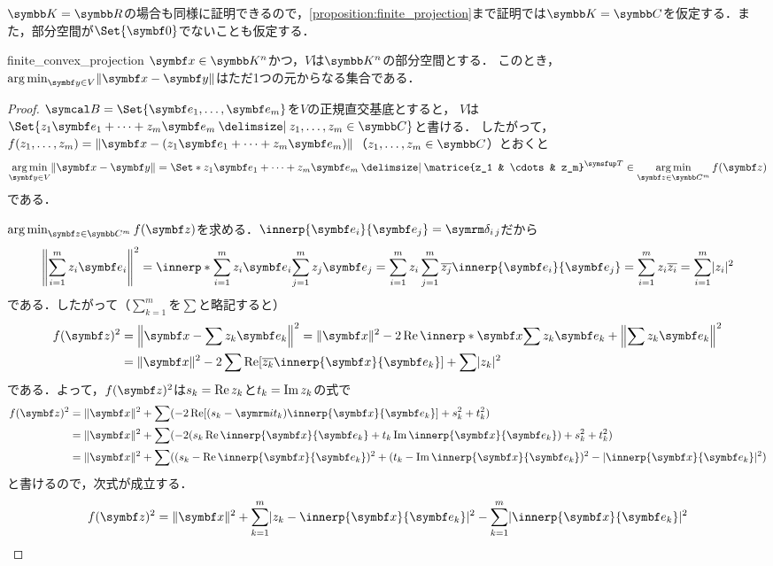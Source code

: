 \documentclass[../../main]{subfiles}
\begin{document}
\(\numset{K}=\numset{R}\)の場合も同様に証明できるので，\cref{proposition:finite_projection}まで証明では\(\numset{K}=\numset{C}\)を仮定する．また，部分空間が\(\Set{\zvec}\)でないことも仮定する．

\begin{proposition}{}{finite_convex_projection}
  \(\vect{x}\in\numset{K}^n\)かつ，\(V\)は\(\numset{K}^n\)の部分空間とする．
  このとき，\(\argmin_{\vect{y}\in V}\vnorm{\vect{x}-\vect{y}}\)はただ1つの元からなる集合である．
\end{proposition}

\begin{proof}
  \(\basis{B}=\Set{\vect{e}_1,\dots,\vect{e}_m}\)を\(V\)の正規直交基底とすると，
  \(V\)は\(\Set{z_1\vect{e}_1+\dots+z_m\vect{e}_m\given z_1,\dots,z_m\in\numset{C}}\)と書ける．
  したがって，\(f(z_1,\dots,z_m)=\vnorm{\vect{x}-(z_1\vect{e}_1+\dots+z_m\vect{e}_m)}\)（\(z_1,\dots,z_m\in\numset{C}\)）とおくと
  \[
    \argmin_{\vect{y}\in V}\vnorm{\vect{x}-\vect{y}} = \Set*{z_1\vect{e}_1+\dots+z_m\vect{e}_m\given\trps{\matrice{z_1 & \cdots & z_m}}\in\argmin_{\vect{z}\in\numset{C}^m}f(\vect{z})}
  \]
  である．

  \(\argmin_{\vect{z}\in\numset{C}^m}f(\vect{z})\)を求める．\(\innerp{\vect{e}_i}{\vect{e}_j}=\kdelta{i}{j}\)だから
  \[
    \vnorm*{\sum_{i=1}^mz_i\vect{e}_i}^2 = \innerp*{\sum_{i=1}^mz_i\vect{e}_i}{\sum_{j=1}^mz_j\vect{e}_j}
    = \sum_{i=1}^mz_i\sum_{j=1}^m\conj{z_j}\innerp{\vect{e}_i}{\vect{e}_j}
    = \sum_{i=1}^mz_i\conj{z_i}
    = \sum_{i=1}^m\abs{z_i}^2
  \]
  である．したがって（\(\sum_{k=1}^m\)を\(\sum\)と略記すると）
  \begin{align*}
    f(\vect{z})^2 &= \vnorm*{\vect{x}-\sum z_k\vect{e}_k}^2 = \vnorm{\vect{x}}^2-2\rpart\innerp*{\vect{x}}{\sum z_k\vect{e}_k}+\vnorm*{\sum z_k\vect{e}_k}^2 \\
    &= \vnorm{\vect{x}}^2-2\sum\rpart[\conj{z_k}\innerp{\vect{x}}{\vect{e}_k}]+\sum\abs{z_k}^2
  \end{align*}
  である．よって，\(f(\vect{z})^2\)は\(s_k=\operatorname{Re} z_k\)と\(t_k=\operatorname{Im} z_k\)の式で
  \begin{align*}
    f(\vect{z})^2 &= \vnorm{\vect{x}}^2+\sum(-2\rpart[(s_k-\iuni t_k)\innerp{\vect{x}}{\vect{e}_k}]+s_k^2+t_k^2) \\
    &= \vnorm{\vect{x}}^2+\sum(-2(s_k\rpart\innerp{\vect{x}}{\vect{e}_k}+t_k\ipart\innerp{\vect{x}}{\vect{e}_k})+s_k^2+t_k^2) \\
    &= \vnorm{\vect{x}}^2+\sum((s_k-\rpart\innerp{\vect{x}}{\vect{e}_k})^2+(t_k-\ipart\innerp{\vect{x}}{\vect{e}_k})^2-\abs{\innerp{\vect{x}}{\vect{e}_k}}^2)
  \end{align*}
  と書けるので，次式が成立する．
  \begin{equation}
    \label{equation:pre_bessels_inequality}
    f(\vect{z})^2 = \vnorm{\vect{x}}^2+\sum_{k=1}^m\abs{z_k-\innerp{\vect{x}}{\vect{e}_k}}^2-\sum_{k=1}^m\abs{\innerp{\vect{x}}{\vect{e}_k}}^2
  \end{equation}


\end{proof}
\end{document}
